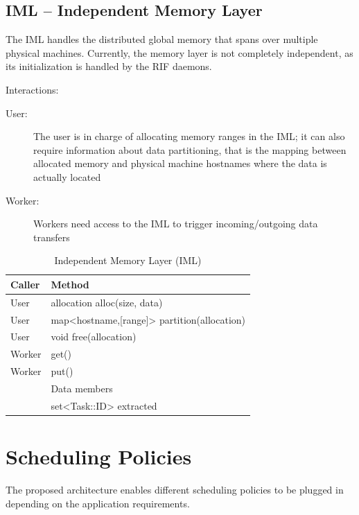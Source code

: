 \documentclass[10pt]{article}
\newcommand{\user}{User\xspace}
\newcommand{\worker}{Worker\xspace}
\newcommand{\iml}{IML\xspace}
\newcommand{\rif}{RIF\xspace}
\newcommand{\task}{Task\xspace}
\newcommand{\id}{::ID\xspace}
\begin{document}
\subsection{IML -- Independent Memory Layer}
The \iml handles the distributed global memory that spans over multiple 
physical machines.
Currently, the memory layer is not completely independent, as its 
initialization is handled by the \rif daemons. 

Interactions:
\begin{description}
    \item [\user:] The user is in charge of allocating memory ranges in the
    \iml; it can also require information about data partitioning, that is the
    mapping between allocated memory and physical machine hostnames where the 
    data is actually located
    \item [\worker:] Workers need access to the \iml to trigger
    incoming/outgoing data transfers
\end{description}
%
\begin{table}[ht]
    \centering
    \caption{Independent Memory Layer (IML)}
    \label{tab:iml}
    \bgroup
    \setlength{\tabcolsep}{2em}
    \begin{tabular}{ll}
        \toprule
        Caller & Method \\
        \midrule
        \user & allocation alloc(size, data) \\
        \user & map<hostname,[range]> partition(allocation) \\
        \user & void free(allocation)  \\
        \worker & get() \\
        \worker & put() \\
        \midrule
        & Data members \\
        \midrule
        & set<\task\id> extracted \\
        \bottomrule
    \end{tabular}
    \egroup
\end{table}
%



\section{Scheduling Policies}

The proposed architecture enables different scheduling policies to be plugged 
in depending on the application requirements.
\end{document}
